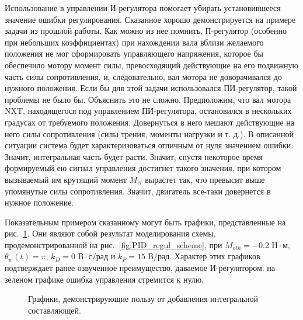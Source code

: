\documentclass[12pt,a4paper,openany]{extarticle}
\begin{document}
Использование в управлении И-регулятора помогает убирать установившееся значение ошибки регулирования.
Сказанное хорошо демонстрируется на примере задачи из прошлой работы.
Как можно из нее помнить, П-регулятор (особенно при небольших коэффициентах) при нахождении вала вблизи желаемого положения не мог сформировать управляющего напряжения, которое бы обеспечило мотору момент силы, превосходящий действующие на его подвижную часть силы сопротивления, и, следовательно, вал мотора не доворачивался до нужного положения.
Если бы для этой задачи использовался ПИ-регулятор, такой проблемы не было бы.
Объяснить это не сложно.
Предположим, что вал мотора NXT, находящегося под управлением ПИ-регулятора, остановился в нескольких градусах от требуемого положения. Довернуться в него мешают действующие на него силы сопротивления (силы трения, моменты нагрузки и т. д.).
В описанной ситуации система будет характеризоваться отличным от нуля значением ошибки.
Значит, интегральная часть будет расти.
Значит, спустя некоторое время формируемый ею сигнал управления достигнет такого значения, при котором вызываемый им крутящий момент $M_{el}$ вырастет так, что превысит выше упомянутые силы сопротивления.
Значит, двигатель все-таки довернется в нужное положение.

Показательным примером сказанному могут быть графики, представленные на рис.~\ref{fig:PI_regul_achievs}.
Они являют собой результат моделирования схемы, продемонстрированной на рис.~\ref{fig:PID_regul_scheme}, при $M_{oth} = -0.2\text{ Н}{\cdot}\text{м}$, $\theta_w(t)=\pi$, $k_D = 0\text{ В}{\cdot}\text{с}/\text{рад}$ и $k_P = 15\text{ В/рад}$.
Характер этих графиков подтверждает ранее озвученное преимущество, даваемое И-регулятором: на зеленом графике ошибка управления стремится к нулю.

\begin{figure}[h!]
	\vspace{-1cm}
	\caption{Графики, демонстрирующие пользу от добавления интегральной составляющей.}
	\label{fig:PI_regul_achievs}
\end{figure}	
\end{document}
